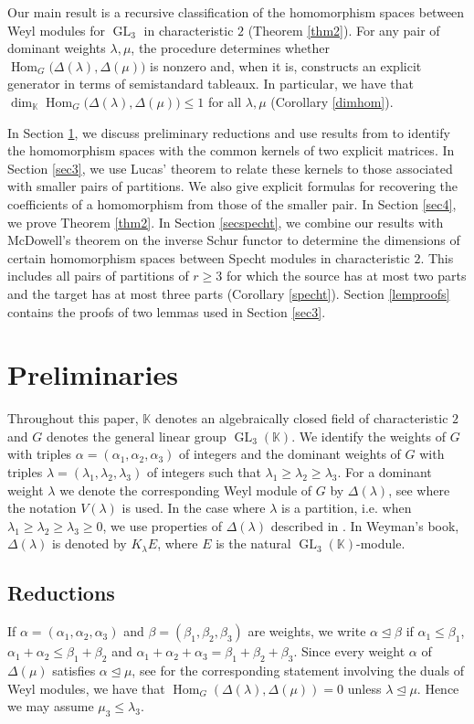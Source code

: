 \documentclass[11pt]{amsart}
\theoremstyle{remark}
\theoremstyle{definition}
\newcommand{\Hom}{\operatorname{Hom}}
\newcommand{\GL}{\operatorname{GL}}
\newcommand{\D}{\Delta}
\newcommand{\la}{\lambda}
\newcommand{\K}{\mathbb K}
\numberwithin{equation}{section}
\begin{document}
Our main result is a recursive classification of the homomorphism spaces between Weyl modules for $\GL_3$ in characteristic $2$ (Theorem \ref{thm2}). For any pair of dominant weights $\la, \mu$, the procedure determines whether $\Hom_G\bigl(\Delta(\la),\Delta(\mu)\bigr)$ is nonzero and, when it is, constructs an explicit generator in terms of semistandard tableaux. In particular, we have that
$\dim_\K\Hom_G\bigl(\Delta(\la),\Delta(\mu)\bigr)\le1$ for all $\la, \mu$ (Corollary \ref{dimhom}).

In Section \ref{sec2}, we discuss preliminary reductions and use results from \cite{MS} to identify the homomorphism spaces with the common kernels of two explicit matrices. In Section \ref{sec3}, we use Lucas' theorem to relate these kernels to those associated with smaller pairs of partitions. We also give explicit formulas for recovering the coefficients of a homomorphism from those of the smaller pair. In Section \ref{sec4}, we prove Theorem \ref{thm2}. In Section \ref{secspecht}, we combine our results with McDowell's theorem on the inverse Schur functor \cite{McD} to determine the dimensions of certain homomorphism spaces between Specht modules in characteristic $2$. This includes all pairs of partitions of $r\ge3$ for which the source has at most two parts and the target has at most three parts (Corollary \ref{specht}). Section \ref{lemproofs} contains the proofs of two lemmas used in Section \ref{sec3}.

	\section{Preliminaries}\label{sec2}

Throughout this paper, $\K$ denotes an algebraically closed field of characteristic $2$ and $G$ denotes the general linear group $\GL_3(\K)$.	We identify the weights of $G$ with triples $\alpha = (\alpha_1, \alpha_2, \alpha_3)$ of integers and the dominant weights of $G$ with triples $\la =(\la_1, \la_2, \la_3)$ of integers such that $\la_1 \ge \la_2 \ge \la_3$. For a dominant weight $\la$ we denote the corresponding Weyl module of $G$ by $\Delta(\la)$, see \cite[II.2.13]{Ja} where the notation $V(\la)$ is used. In the case where $\la$ is a partition, i.e. when $\la_1 \ge \la_2 \ge \la_3 \ge 0$, we use properties of $\D(\la)$ described in \cite[Section 2]{W}. In Weyman's book, $\D(\la)$ is denoted by $K_\la E$, where $E$ is the natural $\GL_3(\K)$-module.

\subsection{Reductions}\label{secred}If	$\alpha=(\alpha_1, \alpha_2, \alpha_3)$ and $\beta=(\beta_1, \beta_2, \beta_3)$ are weights,
	 we write $ \alpha \unlhd \beta$ if $\alpha_1 \le \beta_1$, $\alpha_1 +\alpha_2 \le \beta_1 +\beta_2$ and $\alpha_1 +\alpha_2 +\alpha_3 = \beta_1 +\beta_2 +\beta_3$. Since every weight $\alpha$ of $\Delta(\mu)$ satisfies $\alpha \unlhd \mu$, see \cite[II.2.2, Proposition (b)]{Ja} for the corresponding statement involving the duals of Weyl modules, we have that $\Hom_G(\Delta(\la),\D(\mu))=0$ unless $ \la \unlhd \mu$. Hence we may assume $\mu_3 \le \la_3$.
\end{document}
